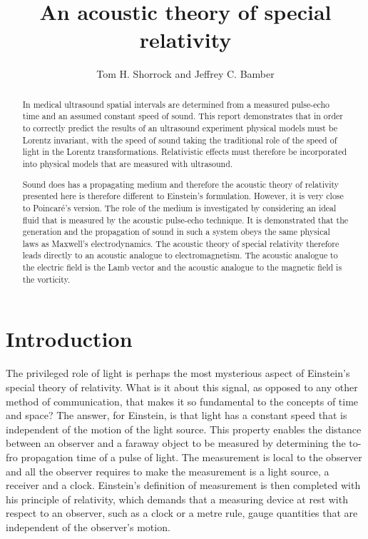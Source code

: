 \documentclass[10pt, fleqn,final,showtrims,oldfontcommands, article,a4paper,oneside]{memoir} %
\newcommand{\Poincare}{Poincar{\'e}\xspace}
\begin{document}
\title{An acoustic theory of special relativity}

\author{Tom H. Shorrock and Jeffrey C. Bamber}

\maketitle

\begin{abstract}

In medical ultrasound spatial intervals are determined  from a measured pulse-echo time and an  assumed constant speed of sound.
This report demonstrates that in order to correctly predict the results of an ultrasound experiment
physical models must be Lorentz invariant, with the speed of sound taking the traditional  role of the speed of light in the Lorentz transformations.
Relativistic effects must therefore be incorporated into physical models that are measured with ultrasound.

Sound does has a propagating medium and therefore 
the acoustic theory of relativity presented here is therefore  different to Einstein's formulation.
However, it is very close to \Poincare's version.
The role of the medium is investigated by considering  an 
ideal fluid that is measured by the acoustic pulse-echo technique.
It is demonstrated that the generation and the propagation of  sound in such a system obeys the same physical laws as Maxwell's  electrodynamics.
The acoustic theory of special relativity therefore leads directly to an acoustic analogue to electromagnetism.
The acoustic analogue to the electric field is the Lamb vector 
and the acoustic analogue to the magnetic field is the vorticity.


\end{abstract}

\section{Introduction}\label{sec:introduction}

The privileged role of light is perhaps the most mysterious aspect of Einstein's special theory of relativity.
What is it about this signal, as opposed to any other method of communication, that makes it  so fundamental to the  concepts of time and space?
The answer, for Einstein, is  that light has a constant speed that  is independent of the motion of the light source\cite{Einstein1905}.
This  property enables the  distance between an observer and a faraway object  to be measured  by determining the to-fro propagation time of a pulse of light.
The measurement is local to the observer and all the observer requires to make the measurement 
 is a light source, a receiver and a clock.
Einstein's definition of measurement is then completed with his principle of relativity,
which demands that a measuring device at rest with respect to an observer, such as a clock or a metre rule, 
gauge quantities that are independent of the observer's motion\cite{Einstein1905, Pierseaux2005}.
\end{document}
